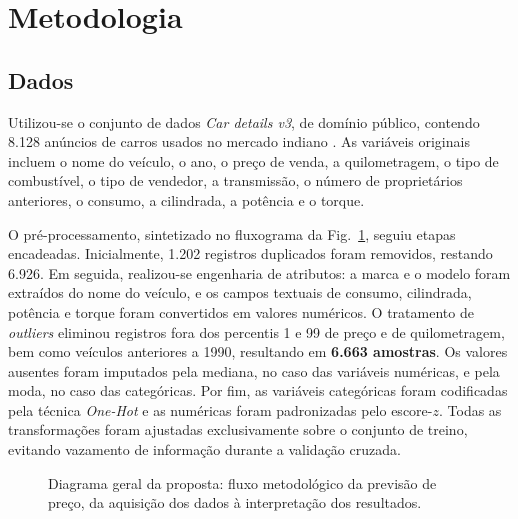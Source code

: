 \documentclass[conference]{IEEEtran}
\begin{document}
\section{Metodologia}

\subsection{Dados}
Utilizou-se o conjunto de dados \textit{Car details v3}, de domínio público, contendo 8.128 anúncios de carros usados no mercado indiano \cite{cardekho}. As variáveis originais incluem o nome do veículo, o ano, o preço de venda, a quilometragem, o tipo de combustível, o tipo de vendedor, a transmissão, o número de proprietários anteriores, o consumo, a cilindrada, a potência e o torque.

O pré-processamento, sintetizado no fluxograma da Fig.~\ref{fig:pipeline}, seguiu etapas encadeadas. Inicialmente, 1.202 registros duplicados foram removidos, restando 6.926. Em seguida, realizou-se engenharia de atributos: a marca e o modelo foram extraídos do nome do veículo, e os campos textuais de consumo, cilindrada, potência e torque foram convertidos em valores numéricos. O tratamento de \textit{outliers} eliminou registros fora dos percentis 1 e 99 de preço e de quilometragem, bem como veículos anteriores a 1990, resultando em \textbf{6.663 amostras}. Os valores ausentes foram imputados pela mediana, no caso das variáveis numéricas, e pela moda, no caso das categóricas. Por fim, as variáveis categóricas foram codificadas pela técnica \textit{One-Hot} e as numéricas foram padronizadas pelo escore-$z$. Todas as transformações foram ajustadas exclusivamente sobre o conjunto de treino, evitando vazamento de informação durante a validação cruzada.

\begin{figure}[t]
\centering
{}
\caption{Diagrama geral da proposta: fluxo metodológico da previsão de preço, da aquisição dos dados à interpretação dos resultados.}
\label{fig:pipeline}
\end{figure}
\end{document}
